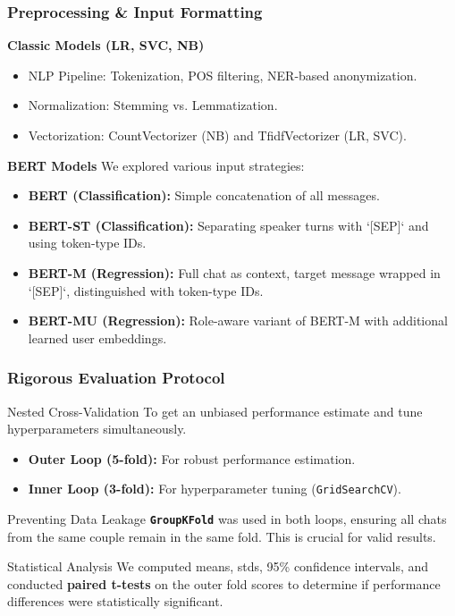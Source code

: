 \documentclass[aspectratio=169]{beamer}
\begin{document}
\begin{frame}
  \frametitle{Preprocessing \& Input Formatting}
  
  \textbf{Classic Models (LR, SVC, NB)}
    \begin{itemize}
      \item NLP Pipeline: Tokenization, POS filtering, NER-based anonymization.
      \item Normalization: Stemming vs. Lemmatization.
      \item Vectorization: CountVectorizer (NB) and TfidfVectorizer (LR, SVC).
    \end{itemize}
  
  \textbf{BERT Models}
    We explored various input strategies:
    \begin{itemize}
      \item \textbf{BERT (Classification):} Simple concatenation of all messages.
      \item \textbf{BERT-ST (Classification):} Separating speaker turns with `[SEP]` and using token-type IDs.
      \item \textbf{BERT-M (Regression):} Full chat as context, target message wrapped in `[SEP]`, distinguished with token-type IDs.
      \item \textbf{BERT-MU (Regression):} Role-aware variant of BERT-M with additional learned user embeddings.
    \end{itemize}
\end{frame}

\begin{frame}
  \frametitle{Rigorous Evaluation Protocol}
  
  \begin{alertblock}{Nested Cross-Validation}
    To get an unbiased performance estimate and tune hyperparameters simultaneously.
    \begin{itemize}
      \item \textbf{Outer Loop (5-fold):} For robust performance estimation.
      \item \textbf{Inner Loop (3-fold):} For hyperparameter tuning (\texttt{GridSearchCV}).
    \end{itemize}
  \end{alertblock}
  
  \begin{block}{Preventing Data Leakage}
    \textbf{\texttt{GroupKFold}} was used in both loops, ensuring all chats from the same couple remain in the same fold. This is crucial for valid results.
  \end{block}
  
  \begin{block}{Statistical Analysis}
    We computed means, stds, 95\% confidence intervals, and conducted \textbf{paired t-tests} on the outer fold scores to determine if performance differences were statistically significant.
  \end{block}
\end{frame}
\end{document}
